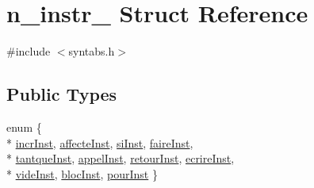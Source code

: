 \hypertarget{structn__instr__}{}\section{n\+\_\+instr\+\_\+ Struct Reference}
\label{structn__instr__}


{\ttfamily \#include $<$syntabs.\+h$>$}

\subsection*{Public Types}
\begin{DoxyCompactItemize}
\item 
enum \{ \\*
\hyperlink{structn__instr___ab0c6a5a342c258a1c2f0b3e3400eb9e0acb8ecbe635b70f8a0d07e70289dd2227}{incr\+Inst}, 
\hyperlink{structn__instr___ab0c6a5a342c258a1c2f0b3e3400eb9e0a05544189c42d0de697adb12c856b3355}{affecte\+Inst}, 
\hyperlink{structn__instr___ab0c6a5a342c258a1c2f0b3e3400eb9e0a5e901e9991a268d409682f9d88679371}{si\+Inst}, 
\hyperlink{structn__instr___ab0c6a5a342c258a1c2f0b3e3400eb9e0a9e3eaeac5cbe77c8fbe0236bb8ee01af}{faire\+Inst}, 
\\*
\hyperlink{structn__instr___ab0c6a5a342c258a1c2f0b3e3400eb9e0a8112e79ffcbdf2b3d1527fab982df614}{tantque\+Inst}, 
\hyperlink{structn__instr___ab0c6a5a342c258a1c2f0b3e3400eb9e0a501ceca867ffb7cb11a1ddb9d5702a4f}{appel\+Inst}, 
\hyperlink{structn__instr___ab0c6a5a342c258a1c2f0b3e3400eb9e0a78737dad06a2e6d859ebe95cf45a3842}{retour\+Inst}, 
\hyperlink{structn__instr___ab0c6a5a342c258a1c2f0b3e3400eb9e0aeb845e4a2c36de61465345a393eef386}{ecrire\+Inst}, 
\\*
\hyperlink{structn__instr___ab0c6a5a342c258a1c2f0b3e3400eb9e0ab072d7fe2c07b795484c449e6d8cf019}{vide\+Inst}, 
\hyperlink{structn__instr___ab0c6a5a342c258a1c2f0b3e3400eb9e0a2054d8c80e132c2c65af98bc5395c4d0}{bloc\+Inst}, 
\hyperlink{structn__instr___ab0c6a5a342c258a1c2f0b3e3400eb9e0a5564881380087630b17b414683525bca}{pour\+Inst}
 \}
\end{DoxyCompactItemize}

